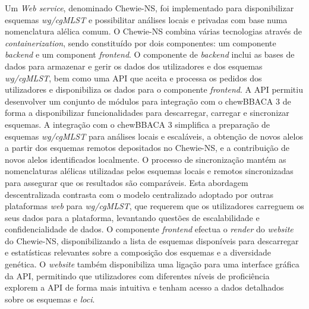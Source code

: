 Um \textit{Web service}, denominado Chewie-NS, foi implementado para disponibilizar esquemas \textit{wg/cgMLST} e possibilitar análises locais e privadas com base numa nomenclatura alélica comum. O Chewie-NS combina várias tecnologias através de \textit{containerization}, sendo constituído por dois componentes: um componente \textit{backend} e um component \textit{frontend}. O componente de \textit{backend} inclui as bases de dados para armazenar e gerir os dados dos utilizadores e dos esquemas \textit{wg/cgMLST}, bem como uma API que aceita e processa os pedidos dos utilizadores e disponibiliza os dados para o componente \textit{frontend}. A API permitiu desenvolver um conjunto de módulos para integração com o chewBBACA 3 de forma a disponibilizar funcionalidades para descarregar, carregar e sincronizar esquemas. A integração com o chewBBACA 3 simplifica a preparação de esquemas \textit{wg/cgMLST} para análises locais e escaláveis, a obtenção de novos alelos a partir dos esquemas remotos depositados no Chewie-NS, e a contribuição de novos alelos identificados localmente. O processo de sincronização mantém as nomenclaturas alélicas utilizadas pelos esquemas locais e remotos sincronizadas para assegurar que os resultados são comparáveis. Esta abordagem descentralizada contrasta com o modelo centralizado adoptado por outras plataformas \textit{web} para \textit{wg/cgMLST}, que requerem que os utilizadores carreguem os seus dados para a plataforma, levantando questões de escalabilidade e confidencialidade de dados. O componente \textit{frontend} efectua o \textit{render} do \textit{website} do Chewie-NS, disponibilizando a lista de esquemas disponíveis para descarregar e estatísticas relevantes sobre a composição dos esquemas e a diversidade genética. O \textit{website} também disponibiliza uma ligação para uma interface gráfica da API, permitindo que utilizadores com diferentes níveis de proficiência explorem a API de forma mais intuitiva e tenham acesso a dados detalhados sobre os esquemas e \textit{loci}.

